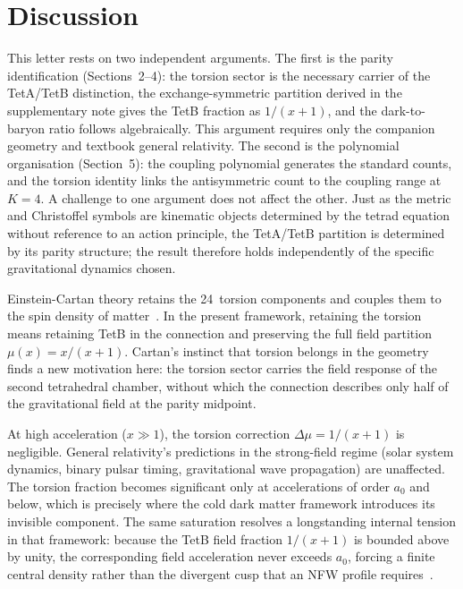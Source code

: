 \documentclass[twocolumn]{iopjournal}
\begin{document}

\section{Discussion}

This letter rests on two independent arguments. The first is the
parity identification (Sections~2--4): the torsion sector is the
necessary carrier of the TetA/TetB distinction, the
exchange-symmetric partition derived in the
supplementary note gives the TetB fraction as
$1/(x{+}1)$, and the dark-to-baryon ratio follows algebraically.
This argument requires only the companion geometry and textbook
general relativity. The second is the polynomial organisation
(Section~5): the coupling polynomial generates the standard
counts, and the torsion identity links the antisymmetric count to
the coupling range at $K = 4$. A challenge to one argument does
not affect the other. Just as the metric and Christoffel
symbols are kinematic objects determined by the tetrad equation
without reference to an action principle, the TetA/TetB
partition is determined by its parity structure; the result
therefore holds independently of the specific gravitational
dynamics chosen.

Einstein-Cartan theory retains the 24~torsion components and
couples them to the spin density of
matter~\cite{Hehl1976}. In the present framework, retaining the
torsion means retaining TetB in the connection and preserving
the full field partition $\mu(x) = x/(x{+}1)$. Cartan's
instinct that torsion belongs in the geometry finds a new
motivation here: the torsion sector carries the field response
of the second tetrahedral chamber, without which the connection
describes only half of the gravitational field at the parity
midpoint.

At high acceleration ($x \gg 1$), the torsion correction
$\Delta\mu = 1/(x{+}1)$ is negligible. General relativity's
predictions in the strong-field regime (solar system
dynamics, binary pulsar timing, gravitational wave propagation)
are unaffected. The torsion fraction becomes significant
only at accelerations of order $a_0$ and below, which is
precisely where the cold dark matter framework introduces its
invisible component. The same saturation resolves a longstanding
internal tension in that framework: because the TetB field
fraction $1/(x{+}1)$ is bounded above by unity, the
corresponding field acceleration never exceeds $a_0$, forcing a
finite central density rather than the divergent cusp that an
NFW profile requires~\cite{NFW1996}.
\end{document}
